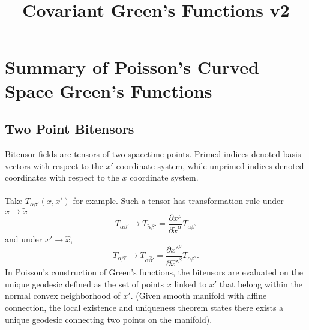 \documentclass[10pt,letterpaper]{article}
\title{Covariant Green's Functions v2 }
\date{}
\begin{document}
\maketitle
\noindent 
\section{Summary of Poisson's Curved Space Green's Functions}
%
\subsection{Two Point Bitensors}
Bitensor fields are tensors of two spacetime points. Primed indices denoted basis vectors with respect to the $x'$ coordinate system, while unprimed indices denoted coordinates with respect to the $x$ coordinate system.
\\ \\
Take $T_{\alpha\beta'}(x,x')$ for example. 
Such a tensor has transformation rule under $x\to \tilde x$
\begin{equation}
T_{\alpha\beta'} \to T_{\tilde\alpha \beta'} = \frac{\partial x^\rho}{\partial \tilde x^\alpha}T_{\alpha\beta'}
\end{equation}
and under $x' \to \hat x$,
\begin{equation}
T_{\alpha\beta'} \to T_{\alpha \hat\beta'} = \frac{\partial x'^\rho}{\partial \hat x'^\beta}T_{\alpha\beta'}.
\end{equation}
In Poisson's construction of Green's functions, the bitensors are evaluated on the unique geodesic defined as the set of points $x$ linked to $x'$ that belong within the normal convex neighborhood of $x'$. (Given smooth manifold with affine connection, the local existence and uniqueness theorem states there exists a unique geodesic connecting two points on the manifold).
\end{document}
